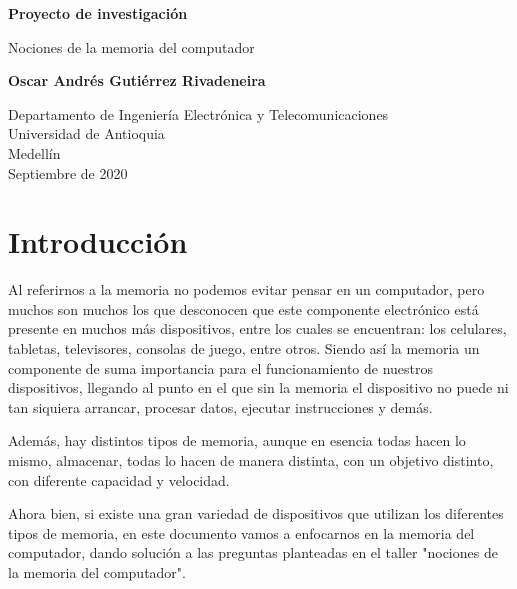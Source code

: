 \documentclass{article}
\begin{document}
\begin{titlepage}
    \begin{center}
        \vspace*{1cm}
            
        \Huge
        \textbf{Proyecto de investigación}
            
        \vspace{0.5cm}
        \LARGE
        Nociones de la memoria del computador
            
        \vspace{1.5cm}
            
        \textbf{Oscar Andrés Gutiérrez Rivadeneira}
            
        \vfill
            
        \vspace{0.8cm}
            
        \LARGE
        Departamento de Ingeniería Electrónica y Telecomunicaciones\\
        Universidad de Antioquia\\
        Medellín\\
        Septiembre de 2020
            
    \end{center}
\end{titlepage}

\tableofcontents

\newpage

\section{Introducción} 
Al referirnos a la memoria no podemos evitar pensar en un computador, pero muchos son muchos los que desconocen que este componente electrónico está presente en muchos más dispositivos, entre los cuales se encuentran: los celulares, tabletas, televisores, consolas de juego, entre otros. Siendo así la memoria un componente de suma importancia para el funcionamiento de nuestros dispositivos, llegando al punto en el que sin la memoria el dispositivo no puede ni tan siquiera arrancar, procesar datos, ejecutar instrucciones y demás.\cite{tipos-memoria}

Además, hay distintos tipos de memoria, aunque en esencia todas hacen lo mismo, almacenar, todas lo hacen de manera distinta, con un objetivo distinto, con diferente capacidad y velocidad.\hfill
\vspace{4mm}

Ahora bien, si existe una gran variedad de dispositivos que utilizan los diferentes tipos de memoria, en este documento vamos a enfocarnos en la memoria del computador, dando solución a las preguntas planteadas en el taller "nociones de la memoria del computador".
\end{document}
